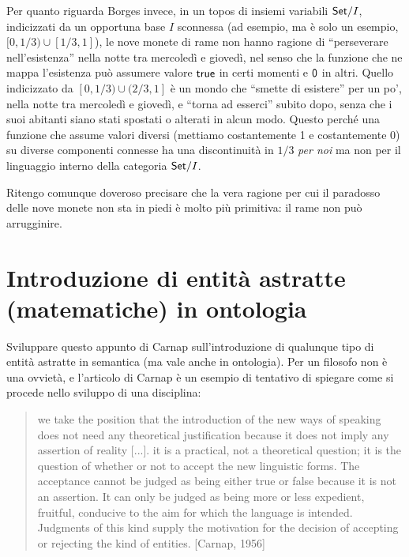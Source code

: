 \documentclass[a4paper, 11pt]{article}
\begin{document}
{Per quanto riguarda Borges invece, in un topos di insiemi variabili ${\sf Set}/I$, indicizzati da un opportuna base $I$ sconnessa (ad esempio, ma è solo un esempio, $[0,1/3)\cup [1/3,1]$), le nove monete di rame non hanno ragione di ``perseverare nell'esistenza'' nella notte tra mercoledì e giovedì, nel senso che la funzione che ne mappa l'esistenza può assumere valore ${\sf true}$ in certi momenti e $\sf 0$ in altri. Quello indicizzato da $[0,1/3)\cup (2/3,1]$ è un mondo che ``smette di esistere'' per un po', nella notte tra mercoledì e giovedì, e ``torna ad esserci'' subito dopo, senza che i suoi abitanti siano stati spostati o alterati in alcun modo. Questo perché una funzione che assume valori diversi (mettiamo costantemente 1 e costantemente 0) su diverse componenti connesse ha una discontinuità in $1/3$ \emph{per noi} ma non per il linguaggio interno della categoria ${\sf Set}/I$.

Ritengo comunque doveroso precisare che la vera ragione per cui il paradosso delle nove monete non sta in piedi è molto più primitiva: il rame non può arrugginire.}\endfo
\section{Introduzione di entità astratte (matematiche) in ontologia}
Sviluppare questo appunto di Carnap sull'introduzione di qualunque tipo di entità astratte in semantica (ma vale anche in ontologia). Per un filosofo non è una ovvietà, e l'articolo di Carnap è un esempio di tentativo di spiegare come si procede nello sviluppo di una disciplina:
\begin{quotation}
	we take the position that
	the introduction of the new ways of speaking does not need any theoretical justification
	because it does not imply any assertion of reality [...].  it is a
	practical, not a theoretical question; it is the question of whether or not to accept the new
	linguistic forms. The acceptance cannot be judged as being either true or false because it is
	not an assertion. It can only be judged as being more or less expedient, fruitful, conducive to
	the aim for which the language is intended. Judgments of this kind supply the motivation for
	the decision of accepting or rejecting the kind of entities. [Carnap, 1956]
\end{quotation}
\end{document}
